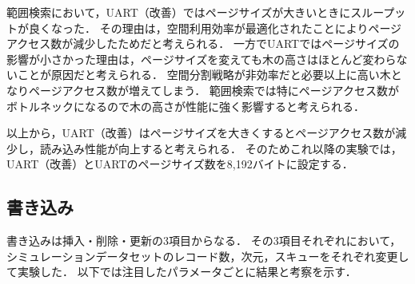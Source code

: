 範囲検索において，UART（改善）ではページサイズが大きいときにスループットが良くなった．
その理由は，空間利用効率が最適化されたことによりページアクセス数が減少したためだと考えられる．
一方でUARTではページサイズの影響が小さかった理由は，ページサイズを変えても木の高さはほとんど変わらないことが原因だと考えられる．
空間分割戦略が非効率だと必要以上に高い木となりページアクセス数が増えてしまう．
範囲検索では特にページアクセス数がボトルネックになるので木の高さが性能に強く影響すると考えられる．

以上から，UART（改善）はページサイズを大きくするとページアクセス数が減少し，読み込み性能が向上すると考えられる．
そのためこれ以降の実験では，UART（改善）とUARTのページサイズ数を8,192バイトに設定する．

\subsection{書き込み}

書き込みは挿入・削除・更新の3項目からなる．
その3項目それぞれにおいて，シミュレーションデータセットのレコード数，次元，スキューをそれぞれ変更して実験した．
以下では注目したパラメータごとに結果と考察を示す．

